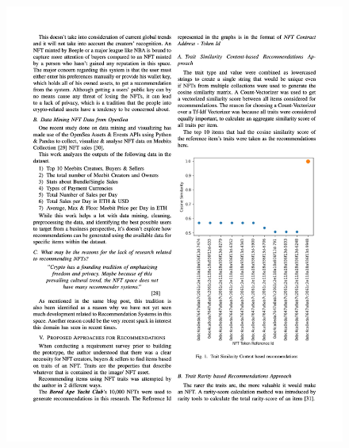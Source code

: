 \begin{figure}[h!]
\centering
\includegraphics[width=\textwidth]{images/appendix/papers/analysis/An Analysis of the Features Considerable for NFT Recommendations 3.jpeg}
\end{figure}

